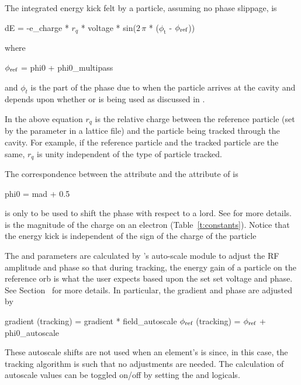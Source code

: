 {The integrated energy kick felt by a particle, assuming no phase slippage, is 
\begin{example}
  dE = -e_charge * \(r_q\) * voltage * sin(\(2\,\pi\) * (\(\phi_\text{t}\) - \(\phi_{\text{ref}}\)))
\end{example}
where
\begin{example}
  \(\phi_{\text{ref}}\) = phi0 + phi0_multipass
  \label{rfcav.phi}
\end{example}
and $\phi_t$ is the part of the phase due to when the particle arrives at the cavity and depends
upon whether  or  is being used as discussed
in .

In the above equation $r_q$ is the relative charge between the reference particle (set by the
 parameter in a lattice file) and the particle being tracked through the
cavity. For example, if the reference particle and the tracked particle are the same, $r_q$ is
unity independent of the type of particle tracked.

The correspondence between the \bmad {} attribute and the  attribute of
\mad is
\begin{example}
  phi0 = mad + 0.5
\end{example}

 is only to be used to shift the phase with respect to a  lord. See
 for more details.  is the magnitude of the charge on an electron
(Table~\ref{t:constants}). Notice that the energy kick is independent of the sign of the charge of
the particle

The  and  parameters are
calculated by \bmad's auto-scale module to adjust the RF amplitude and phase so that during tracking,
the energy gain of
a particle on the reference orb is what the user expects based upon the set set voltage and phase. See
Section~ for more details. In particular, the gradient and phase are adjusted by
\begin{example}
  gradient (tracking) = gradient * field_autoscale
  \(\phi_{\text{ref}}\) (tracking) = \(\phi_{\text{ref}}\) + phi0_autoscale
\end{example}
These autoscale shifts are not used when an element's  is  since,
in this case, the tracking algorithm is such that no adjustments are needed.
The calculation of autoscale values
can be toggled on/off by setting the  and  logicals.

}
